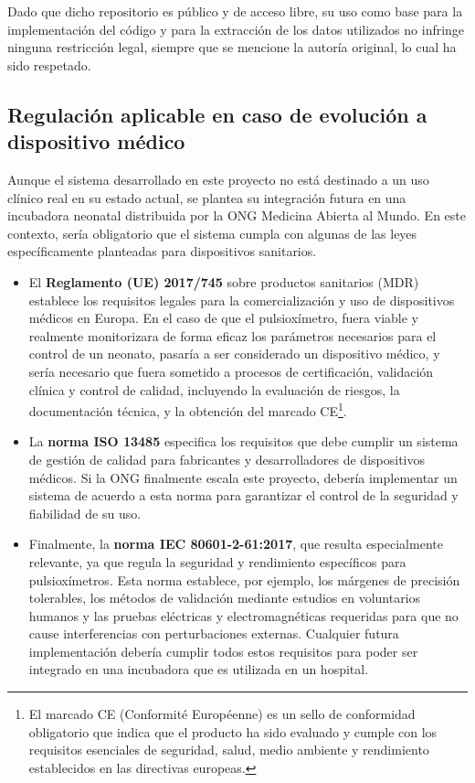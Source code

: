 Dado que dicho repositorio es público y de acceso libre, su uso como base para la implementación del código y para la extracción de los datos utilizados no infringe ninguna restricción legal, siempre que se mencione la autoría original, lo cual ha sido respetado.

\vspace{0.3cm}

\subsection{Regulación aplicable en caso de evolución a dispositivo médico}

Aunque el sistema desarrollado en este proyecto no está destinado a un uso clínico real en su estado actual, se plantea su integración futura en una incubadora neonatal distribuida por la ONG Medicina Abierta al Mundo. En este contexto, sería obligatorio que el sistema cumpla con algunas de las leyes específicamente planteadas para dispositivos sanitarios.

\begin{itemize}
    \item El \textbf{Reglamento (UE) 2017/745} sobre productos sanitarios (MDR)  \cite{mdr2017} establece los requisitos legales para la comercialización y uso de dispositivos médicos en Europa. En el caso de que el pulsioxímetro, fuera viable y realmente monitorizara de forma eficaz los parámetros necesarios para el control de un neonato, pasaría a ser considerado un dispositivo médico, y sería necesario que fuera sometido a procesos de certificación, validación clínica y control de calidad, incluyendo la evaluación de riesgos, la documentación técnica, y la obtención del marcado CE\footnote{El marcado CE (Conformité Européenne) es un sello de conformidad obligatorio que indica que el producto ha sido evaluado y cumple con los requisitos esenciales de seguridad, salud, medio ambiente y rendimiento establecidos en las directivas europeas. }. 

    \item La \textbf{norma ISO 13485}\cite{iso13485} especifica los requisitos que debe cumplir un sistema de gestión de calidad para fabricantes y desarrolladores de dispositivos médicos. Si la ONG finalmente escala este proyecto, debería implementar un sistema de acuerdo a esta norma para garantizar el control de la seguridad y fiabilidad de su uso.

    \item Finalmente, la \textbf{norma IEC 80601-2-61:2017}\cite{iec80601}, que resulta especialmente relevante, ya que regula la seguridad y rendimiento específicos para pulsioxímetros. Esta norma establece, por ejemplo, los márgenes de precisión tolerables, los métodos de validación mediante estudios en voluntarios humanos y las pruebas eléctricas y electromagnéticas requeridas para que no cause interferencias con perturbaciones externas. Cualquier futura implementación debería cumplir todos estos requisitos para poder ser integrado en una incubadora que es utilizada en un hospital.

\end{itemize}


